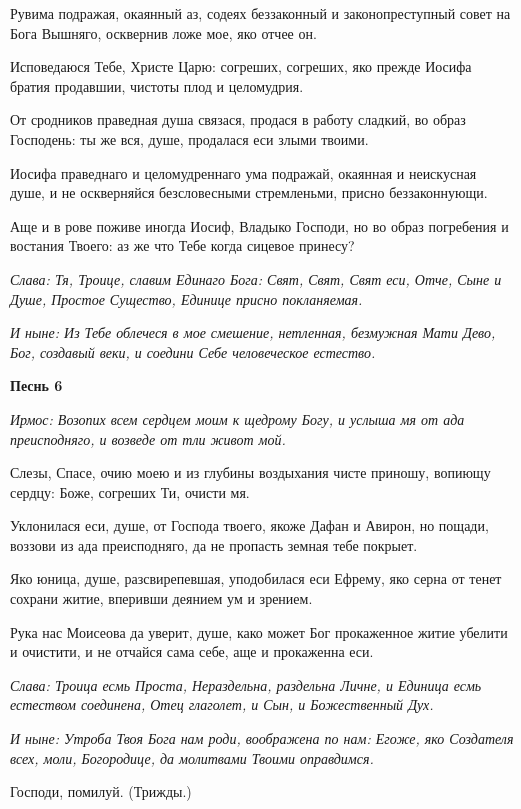 Рувима подражая, окаянный аз, содеях беззаконный и законопреступный совет на Бога Вышняго, осквернив ложе мое, яко отчее он. 

Исповедаюся Тебе, Христе Царю: согреших, согреших, яко прежде Иосифа братия продавшии, чистоты плод и целомудрия. 

От сродников праведная душа связася, продася в работу сладкий, во образ Господень: ты же вся, душе, продалася еси злыми твоими. 

Иосифа праведнаго и целомудреннаго ума подражай, окаянная и неискусная душе, и не оскверняйся безсловесными стремленьми, присно беззаконнующи. 

Аще и в рове поживе иногда Иосиф, Владыко Господи, но во образ погребения и востания Твоего: аз же что Тебе когда сицевое принесу? 

\itshape Слава\normalfont{}: Тя, Троице, славим Единаго Бога: Свят, Свят, Свят еси, Отче, Сыне и Душе, Простое Существо, Единице присно покланяемая. 

\itshape И ныне\normalfont{}: Из Тебе облечеся в мое смешение, нетленная, безмужная Мати Дево, Бог, создавый веки, и соедини Себе человеческое естество. 

\medskip\bfseries Песнь 6\normalfont{}

\itshape Ирмос\normalfont{}: Возопих всем сердцем моим к щедрому Богу, и услыша мя от ада преисподняго, и возведе от тли живот мой. 

Слезы, Спасе, очию моею и из глубины воздыхания чисте приношу, вопиющу сердцу: Боже, согреших Ти, очисти мя. 

Уклонилася еси, душе, от Господа твоего, якоже Дафан и Авирон, но пощади, воззови из ада преисподняго, да не пропасть земная тебе покрыет. 

Яко юница, душе, разсвирепевшая, уподобилася еси Ефрему, яко серна от тенет сохрани житие, вперивши деянием ум и зрением. 

Рука нас Моисеова да уверит, душе, како может Бог прокаженное житие убелити и очистити, и не отчайся сама себе, аще и прокаженна еси. 

\itshape Слава\normalfont{}: Троица есмь Проста, Нераздельна, раздельна Личне, и Единица есмь естеством соединена, Отец глаголет, и Сын, и Божественный Дух. 

\itshape И ныне\normalfont{}: Утроба Твоя Бога нам роди, воображена по нам: Егоже, яко Создателя всех, моли, Богородице, да молитвами Твоими оправдимся. 

Господи, помилуй. (Трижды.) 

